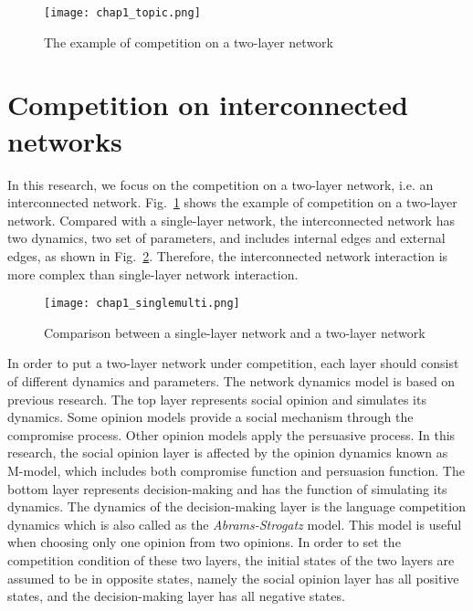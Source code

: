 \begin{figure}[!htb]
	\centering
	\texttt{[image: chap1\_topic.png]}
	\caption{The example of competition on a two-layer network}
	\label{chap1_topic}
\end{figure}

\section{Competition on interconnected networks}
In this research, we focus on the competition on a two-layer network, i.e. an interconnected network. Fig.~\ref{chap1_topic} shows the example of competition on a two-layer network. Compared with a single-layer network, the interconnected network has two dynamics, two set of parameters, and includes internal edges and external edges, as shown in Fig.~\ref{chap1_singlemulti}. Therefore, the interconnected network interaction is more complex than single-layer network interaction.

\begin{figure}[!htb]
	\centering
	\texttt{[image: chap1\_singlemulti.png]}
	\caption{Comparison between a single-layer network and a two-layer network}
	\label{chap1_singlemulti}
\end{figure}

In order to put a two-layer network under competition, each layer should consist of different dynamics and parameters. The network dynamics model is based on previous research\parencite{alvarez2016}. The top layer represents social opinion and simulates its dynamics. Some opinion models provide a social mechanism through the compromise process\parencite{naim2003}. Other opinion models apply the persuasive process\parencite{chau2014}. In this research, the social opinion layer is affected by the opinion dynamics known as M-model\parencite{rocca2014}, which includes both compromise function and persuasion function. The bottom layer represents decision-making and has the function of simulating its dynamics. The dynamics of the decision-making layer is the language competition dynamics which is also called as the \textit{Abrams-Strogatz} model\parencite{abrams2003, vazquez2010, patriarca2012}. This model is useful when choosing only one opinion from two opinions. In order to set the competition condition of these two layers, the initial states of the two layers are assumed to be in opposite states, namely the social opinion layer has all positive states, and the decision-making layer has all negative states\parencite{alvarez2016}.

